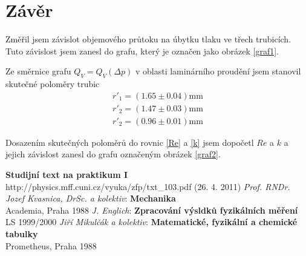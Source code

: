 \documentclass[a4paper,12pt]{article}
\begin{document}
\section{Závěr}
Změřil jsem závislot objemového průtoku na úbytku tlaku ve třech trubicích. Tuto závislost jsem zanesl do grafu, který je označen jako 
obrázek \ref{graf1}.

Ze směrnice grafu $Q_V=Q_V(\Delta p)$ v oblasti laminárního proudění jsem stanovil skutečné poloměry trubic
\begin{eqnarray}
r'_1=(1.65\pm0.04)\mbox{mm} \\
r'_2=(1.47\pm0.03)\mbox{mm} \\
r'_2=(0.96\pm0.01)\mbox{mm} 
\end{eqnarray}

Dosazením skutečných poloměrů do rovnic \ref{Re} a \ref{k} jsem dopočetl $Re$ a $k$ a jejich závislost zanesl do grafu označeným obrázek \ref{graf2}.


\begin{thebibliography}{5}
         \textbf{Studijní text na praktikum I} \\http://physics.mff.cuni.cz/vyuka/zfp/txt\_103.pdf (26. 4. 2011)
         \emph{Prof. RNDr. Jozef Kvasnica, DrSc. a kolektiv}: \textbf{Mechanika}\\ Academia, Praha 1988
         \emph{J. Englich}: \textbf{Zpracování výsldků fyzikálních měření} \\ LS 1999/2000
        \emph{Jiří Mikulčák a kolektiv}: \textbf{Matematické, fyzikální a chemické tabulky} \\ Prometheus, Praha 1988

\end{thebibliography}
\end{document}
